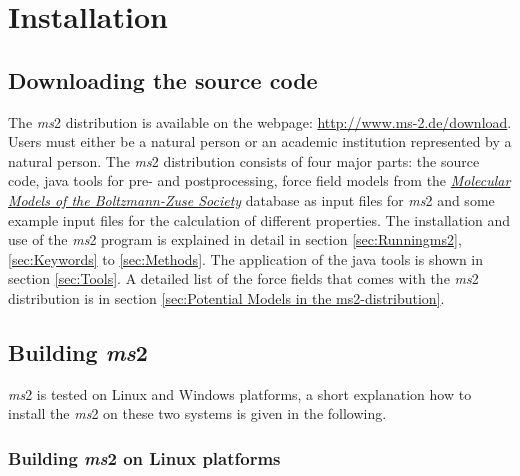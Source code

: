 

\chapter{Installation}
\label{sec:Installation}



\section{Downloading the source code}
\label{sec:Downloading the source Code}
The \textit{ms}2 distribution is available on the webpage: \href{http://www.ms-2.de/download}{http://www.ms-2.de/download}. Users must either be a natural person or an academic institution represented by a natural person. The \textit{ms}2 distribution consists of four major parts: the source code, java tools for pre- and postprocessing, force field models from the \href{http://thermovm.mv.uni-kl.de/moleculeDB/}{\textit{Molecular Models of the Boltzmann-Zuse Society}} database as input files for \textit{ms}2 and some example input files for the calculation of different properties. The installation and use of the \textit{ms}2 program is explained in detail in section \ref{sec:Runningms2}, \ref{sec:Keywords} to \ref{sec:Methods}. The application of the java tools is shown in section \ref{sec:Tools}. A detailed list of the force fields that comes with the \textit{ms}2 distribution is in section \ref{sec:Potential Models in the ms2-distribution}. 



% 





\section{Building \textit{ms}2}
\label{sec:Compiling ms2}
\textit{ms}2 is tested on Linux and Windows platforms, a short explanation how to install the \textit{ms}2 on these two systems is given in the following.


\subsection{Building \textit{ms}2 on Linux platforms}

